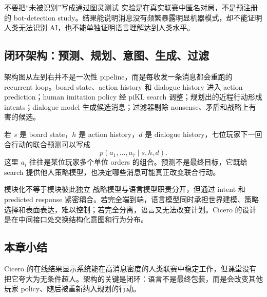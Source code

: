
\begin{warningbox}{不要把“未被识别”写成通过图灵测试}
实验是在真实联赛中匿名对局，不是预注册的 bot-detection study。结果能说明消息没有频繁暴露明显机器模式，却不能证明人类无法识别 AI，也不能单独证明语言理解达到人类水平。
\end{warningbox}


\subsection{闭环架构：预测、规划、意图、生成、过滤}

架构图从左到右并不是一次性 pipeline，而是每收发一条消息都会重跑的 recurrent loop。board state、action history 和 dialogue history 进入 action prediction；human imitation policy 经 piKL search 调整；规划出的近程行动形成 intents；dialogue model 生成候选消息；过滤器剔除 nonsense、矛盾和战略上有害的候选。


若 $s$ 是 board state，$h$ 是 action history，$d$ 是 dialogue history，七位玩家下一回合行动的联合预测可以写成
\begin{equation}
p(a_1,\ldots,a_7\mid s,h,d).
\end{equation}
这里 $a_i$ 往往是某位玩家多个单位 orders 的组合。预测不是最终目标，它既给 search 提供他人策略模型，也决定哪些消息可能真正改变联合行动。

\begin{importantbox}{模块化不等于模块彼此独立}
战略模型与语言模型职责分开，但通过 intent 和 predicted response 紧密耦合。若完全端到端，语言模型同时承担世界建模、策略选择和表面表达，难以控制；若完全分离，语言又无法改变计划。Cicero 的设计是在中间接口处交换结构化意图和行为分布。
\end{importantbox}

\subsection{本章小结}

Cicero 的在线结果显示系统能在高消息密度的人类联赛中稳定工作，但课堂没有把它夸大为无条件超人。架构的关键是闭环：语言不是最终包装，而是会改变其他玩家 policy、随后被重新纳入规划的行动。

